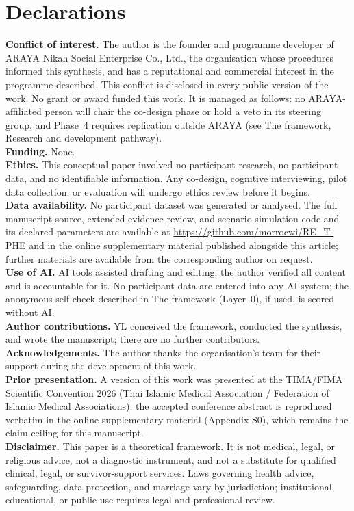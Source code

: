 \documentclass[11pt]{article}
\begin{document}
\section*{Declarations}
\footnotesize
\textbf{Conflict of interest.} The author is the founder and programme developer of ARAYA Nikah Social Enterprise Co., Ltd., the organisation whose procedures informed this synthesis, and has a reputational and commercial interest in the programme described. This conflict is disclosed in every public version of the work. No grant or award funded this work. It is managed as follows: no ARAYA-affiliated person will chair the co-design phase or hold a veto in its steering group, and Phase~4 requires replication outside ARAYA (see The framework, Research and development pathway).\\
\textbf{Funding.} None.\\
\textbf{Ethics.} This conceptual paper involved no participant research, no participant data, and no identifiable information. Any co-design, cognitive interviewing, pilot data collection, or evaluation will undergo ethics review before it begins.\\
\textbf{Data availability.} No participant dataset was generated or analysed. The full manuscript source, extended evidence review, and scenario-simulation code and its declared parameters are available at \url{https://github.com/morrocwi/RE_T-PHE} and in the online supplementary material published alongside this article; further materials are available from the corresponding author on request.\\
\textbf{Use of AI.} AI tools assisted drafting and editing; the author verified all content and is accountable for it. No participant data are entered into any AI system; the anonymous self-check described in The framework (Layer~0), if used, is scored without AI.\\
\textbf{Author contributions.} YL conceived the framework, conducted the synthesis, and wrote the manuscript; there are no further contributors.\\
\textbf{Acknowledgements.} The author thanks the organisation's team for their support during the development of this work.\\
\textbf{Prior presentation.} A version of this work was presented at the TIMA/FIMA Scientific Convention 2026 (Thai Islamic Medical Association / Federation of Islamic Medical Associations); the accepted conference abstract is reproduced verbatim in the online supplementary material (Appendix S0), which remains the claim ceiling for this manuscript.\\
\textbf{Disclaimer.} This paper is a theoretical framework. It is not medical, legal, or religious advice, not a diagnostic instrument, and not a substitute for qualified clinical, legal, or survivor-support services. Laws governing health advice, safeguarding, data protection, and marriage vary by jurisdiction; institutional, educational, or public use requires legal and professional review.
\end{document}
